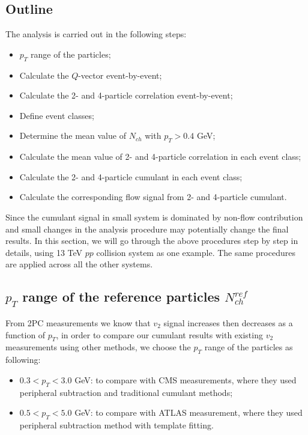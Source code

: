 \subsection{Outline}
The analysis is carried out in the following steps:
\begin{itemize}
\item $p_{T}$ range of the particles;
\item Calculate the $Q$-vector event-by-event;
\item Calculate the 2- and 4-particle correlation event-by-event;
\item Define event classes;
\item Determine the mean value of $N_{ch}$ with $p_{T}>0.4$ GeV;
\item Calculate the mean value of 2- and 4-particle correlation in each event class;
\item Calculate the 2- and 4-particle cumulant in each event class;
\item Calculate the corresponding flow signal from 2- and 4-particle cumulant.
\end{itemize}

Since the cumulant signal in small system is dominated by non-flow contribution and small changes in the analysis procedure may potentially change the final results. In this section, we will go through the above procedures step by step in details, using 13 TeV $pp$ collision system as one example. The same procedures are applied across all the other systems.

\subsection{$p_{T}$ range of the reference particles $N_{ch}^{ref}$}

From 2PC measurements we know that $v_{2}$ signal increases then decreases as a function of $p_{T}$, in order to compare our cumulant results with existing $v_{2}$ measurements using other methods, we choose the $p_{T}$ range of the particles as following:

\begin{itemize}
\item $0.3<p_{T}<3.0$ GeV: to compare with CMS measurements, where they used peripheral subtraction and traditional cumulant methods;
\item $0.5<p_{T}<5.0$ GeV: to compare with ATLAS measurement, where they used peripheral subtraction method with template fitting.
\end{itemize}

